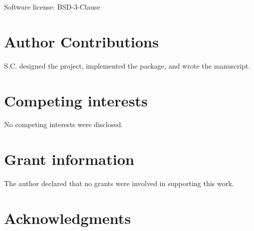 \documentclass[9pt,a4paper]{extarticle}
\begin{document}
Software license: BSD-3-Clause

\section*{Author Contributions}
S.C. designed the project, implemented the package, and wrote the manuscript.

\section*{Competing interests}
No competing interests were disclosed.

\section*{Grant information}
The author declared that no grants were involved in supporting this work.

\section*{Acknowledgments}
\begin{comment}
This section should acknowledge anyone who contributed to the research or the
article but who does not qualify as an author based on the criteria provided earlier
(e.g. someone or an organization that provided writing assistance). Please state how
they contributed; authors should obtain permission to acknowledge from all those
mentioned in the Acknowledgments section.

Please do not list grant funding in this section.
\end{comment}

{\small
}








\end{document}
